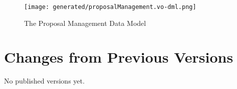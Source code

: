 \documentclass[10pt,a4paper]{ivoa}
\begin{document}

\begin{figure}
    \centering
    \texttt{[image: generated/proposalManagement.vo-dml.png]}
    \caption{The Proposal Management Data Model}
    \label{fig:propmdm}
\end{figure}



\appendix
\section{Changes from Previous Versions}

No published versions yet.



\end{document}
